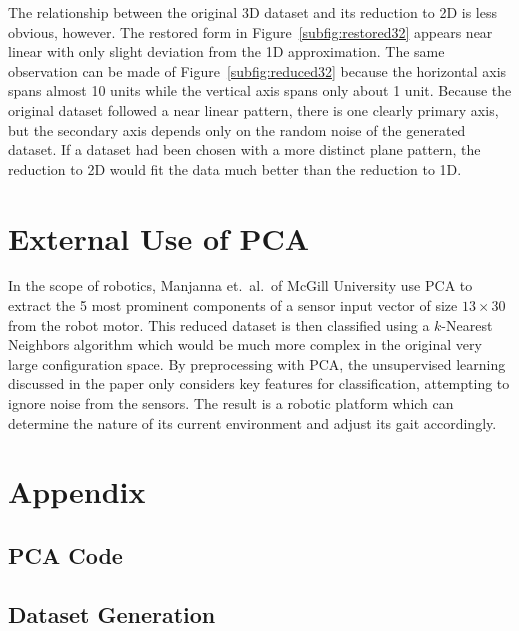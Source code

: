\documentclass{article}
\begin{document}
		The relationship between the original 3D dataset and its reduction to 2D is less obvious, however. The restored form in Figure~\ref{subfig:restored32} appears near linear with only slight deviation from the 1D approximation. The same observation can be made of Figure~\ref{subfig:reduced32} because the horizontal axis spans almost 10 units while the vertical axis spans only about 1 unit. Because the original dataset followed a near linear pattern, there is one clearly primary axis, but the secondary axis depends only on the random noise of the generated dataset. If a dataset had been chosen with a more distinct plane pattern, the reduction to 2D would fit the data much better than the reduction to 1D.

	\section{External Use of PCA}
		In the scope of robotics, Manjanna et.\ al.\ of McGill University use PCA to extract the 5 most prominent components of a sensor input vector of size $13 \times 30$ from the robot motor. This reduced dataset is then classified using a $k$-Nearest Neighbors algorithm which would be much more complex in the original very large configuration space. By preprocessing with PCA, the unsupervised learning discussed in the paper only considers key features for classification, attempting to ignore noise from the sensors. The result is a robotic platform which can determine the nature of its current environment and adjust its gait accordingly.

	\printbibliography{}

	\appendix
	\section{Appendix}
	\setcounter{secnumdepth}{2}
	\renewcommand{\thesubsection}{\Alph{subsection}}
	\subsection{PCA Code} \label{apx:code}
	
	\subsection{Dataset Generation} \label{apx:gen}
	
\end{document}
